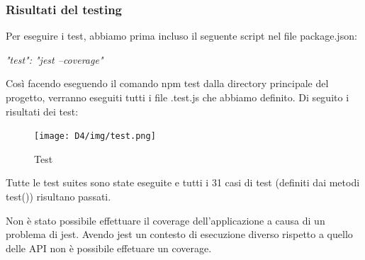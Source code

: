 \documentclass[a4paper,12pt]{article}
\begin{document}
\subsubsection{Risultati del testing}
Per eseguire i test, abbiamo prima incluso il seguente script nel file package.json: 
\begin{center} \textit{"test": "jest --coverage"} \end{center}
Così facendo eseguendo il comando npm test dalla directory principale del progetto, verranno eseguiti tutti i file .test.js che abbiamo definito.
\newline
Di seguito i risultati dei test: 
\begin{figure}[H]
    \centering
    \texttt{[image: D4/img/test.png]}
    \caption{Test}
\end{figure}
Tutte le test suites sono state eseguite e tutti i 31 casi di test (definiti dai metodi test()) risultano passati.

Non è stato possibile effettuare il coverage dell'applicazione a causa di un problema di jest. Avendo jest un contesto di esecuzione diverso rispetto a quello delle API non è possibile effetuare un coverage. 
\newpage
\end{document}
